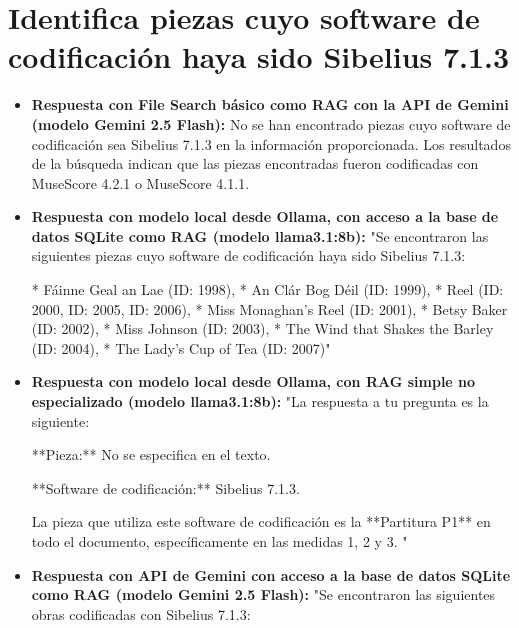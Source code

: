 \section{Identifica piezas cuyo software de codificación haya sido Sibelius 7.1.3}
\begin{itemize}
    \item \textbf{Respuesta con File Search básico como RAG con la API de Gemini (modelo Gemini 2.5 Flash):} No se han encontrado piezas cuyo software de codificación sea Sibelius 7.1.3 en la información proporcionada. Los resultados de la búsqueda indican que las piezas encontradas fueron codificadas con MuseScore 4.2.1 o MuseScore 4.1.1.
    \item \textbf{Respuesta con modelo local desde Ollama, con acceso a la base de datos SQLite como RAG (modelo llama3.1:8b):} "Se encontraron las siguientes piezas cuyo software de codificación haya sido Sibelius 7.1.3:

* Fáinne Geal an Lae (ID: 1998),
* An Clár Bog Déil (ID: 1999),
* Reel (ID: 2000, ID: 2005, ID: 2006),
* Miss Monaghan’s Reel (ID: 2001),
* Betsy Baker (ID: 2002),
* Miss Johnson (ID: 2003),
* The Wind that Shakes the Barley (ID: 2004),
* The Lady’s Cup of Tea (ID: 2007)"
\item \textbf{Respuesta con modelo local desde Ollama, con RAG simple no especializado (modelo llama3.1:8b):} "La respuesta a tu pregunta es la siguiente:

**Pieza:**
No se especifica en el texto.

**Software de codificación:**
Sibelius 7.1.3.

La pieza que utiliza este software de codificación es la **Partitura P1** en todo el documento, específicamente en las medidas 1, 2 y 3.
"
\item \textbf{Respuesta con API de Gemini con acceso a la base de datos SQLite como RAG (modelo Gemini 2.5 Flash):} "Se encontraron las siguientes obras codificadas con Sibelius 7.1.3:


\end{itemize}
